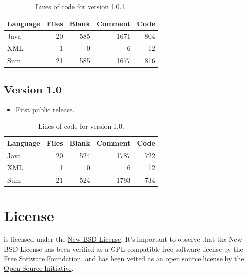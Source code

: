 \documentclass[a4paper,twoside,12pt]{memoir}
\begin{document}
{\renewcommand{\arraystretch}{1.5}
\begin{table}[ht]
\centering
\caption{Lines of code for version 1.0.1.}
\begin{tabular}{lrrrr}
\hline
\textbf{Language} & \textbf{Files} & \textbf{Blank} & \textbf{Comment} & \textbf{Code}\\
\hline
\hline
Java & 20 & 585 & 1671 & 804\\
XML & 1 & 0 & 6 & 12\\
\hline
Sum & 21 & 585 & 1677 & 816\\
\hline
\end{tabular}
\label{tab:locarara101}
\end{table}}

\subsection*{Version 1.0}

\begin{itemize}
\item[\newfeature] First public release.
\end{itemize}

{\renewcommand{\arraystretch}{1.5}
\begin{table}[ht]
\centering
\caption{Lines of code for version 1.0.}
\begin{tabular}{lrrrr}
\hline
\textbf{Language} & \textbf{Files} & \textbf{Blank} & \textbf{Comment} & \textbf{Code}\\
\hline
\hline
Java & 20 & 524 & 1787 & 722\\
XML & 1 & 0 & 6 & 12\\
\hline
Sum & 21 & 524 & 1793 & 734\\
\hline
\end{tabular}
\label{tab:locarara10}
\end{table}}

\cleardoublepage

\section*{License}
\label{sec:license}

\arara is licensed under the 
\href{http://www.opensource.org/licenses/bsd-license.php}{New BSD License}. It's
important to observe that the New BSD License has been verified as a 
GPL-compatible free software license by the 
\href{http://www.fsf.org/}{Free Software Foundation}, and has been vetted as an 
open source license by the 
\href{http://www.opensource.org/}{Open Source Initiative}.
\end{document}
